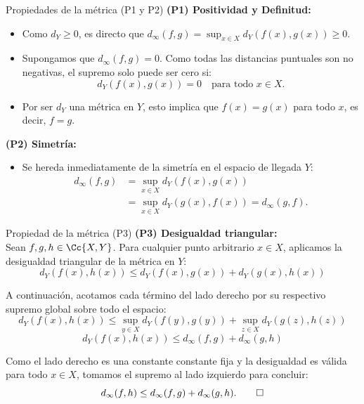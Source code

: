 \begin{frame}{Propiedades de la métrica (P1 y P2)}
    \textbf{(P1) Positividad y Definitud:}
    \begin{itemize}
        \item Como $d_Y \ge 0$, es directo que $d_{\infty}(f,g) = \sup_{x\in X} d_Y(f(x),g(x)) \ge 0$.
        \item Supongamos que $d_{\infty}(f,g) = 0$. Como todas las distancias puntuales son no negativas, el supremo solo puede ser cero si:
        \[ d_Y(f(x), g(x)) = 0 \quad \text{para todo } x \in X. \]
        \item Por ser $d_Y$ una métrica en $Y$, esto implica que $f(x) = g(x)$ para todo $x$, es decir, $f = g$.
    \end{itemize}
    
    \vspace{0.3cm}
    \textbf{(P2) Simetría:}
    \begin{itemize}
        \item Se hereda inmediatamente de la simetría en el espacio de llegada $Y$:
        \begin{align*}
            d_{\infty}(f,g) &= \sup_{x\in X} d_Y(f(x), g(x)) \\
            &= \sup_{x\in X} d_Y(g(x), f(x)) = d_{\infty}(g,f).
        \end{align*}
    \end{itemize}
\end{frame}

\begin{frame}{Propiedad de la métrica (P3)}
    \textbf{(P3) Desigualdad triangular:} \\
    \vspace{0.1cm}
    Sean $f, g, h \in \Cc{X,Y}$. Para cualquier punto arbitrario $x \in X$, aplicamos la desigualdad triangular de la métrica en $Y$:
    \[ d_Y(f(x), h(x)) \le d_Y(f(x), g(x)) + d_Y(g(x), h(x)) \]
    
    \vspace{0.1cm}
    A continuación, acotamos cada término del lado derecho por su respectivo supremo global sobre todo el espacio:
    \[ d_Y(f(x), h(x)) \le \sup_{y\in X} d_Y(f(y), g(y)) + \sup_{z\in X} d_Y(g(z), h(z)) \]
    \[ d_Y(f(x), h(x)) \le d_{\infty}(f,g) + d_{\infty}(g,h) \]
    
    \vspace{0.1cm}
    Como el lado derecho es una constante constante fija y la desigualdad es válida para todo $x \in X$, tomamos el supremo al lado izquierdo para concluir:
    \[ d_{\infty}(f,h) \le d_{\infty}(f,g) + d_{\infty}(g,h). \qed \]
\end{frame}


